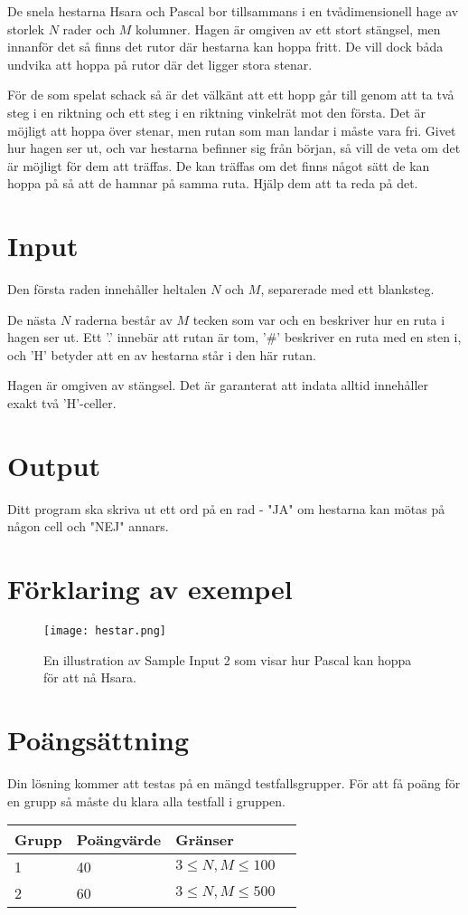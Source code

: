 De snela hestarna Hsara och Pascal bor tillsammans i en tvådimensionell hage av
storlek $N$ rader och $M$ kolumner. Hagen är omgiven av ett stort stängsel, men
innanför det så finns det rutor där hestarna kan hoppa fritt. De vill dock båda
undvika att hoppa på rutor där det ligger stora stenar.

För de som spelat schack så är det välkänt att ett hopp går till genom att ta
två steg i en riktning och ett steg i en riktning vinkelrät mot den första. Det
är möjligt att hoppa över stenar, men rutan som man landar i måste vara fri.
Givet hur hagen ser ut, och var hestarna befinner sig från början, så vill de
veta om det är möjligt för dem att träffas. De kan träffas om det finns något
sätt de kan hoppa på så att de hamnar på samma ruta. Hjälp dem att ta reda på
det.

\section*{Input}
Den första raden innehåller heltalen $N$ och $M$, separerade med ett blanksteg.

De nästa $N$ raderna består av $M$ tecken som var och en beskriver hur en ruta
i hagen ser ut. Ett '.' innebär att rutan är tom, '\#' beskriver en ruta med en
sten i, och 'H' betyder att en av hestarna står i den här rutan.

Hagen är omgiven av stängsel. Det är garanterat att indata alltid innehåller
exakt två 'H'-celler.

\section*{Output}
Ditt program ska skriva ut ett ord på en rad - "JA" om hestarna kan mötas på
någon cell och "NEJ" annars.

\section*{Förklaring av exempel}
\begin{figure}[ht!]
\centering
\texttt{[image: hestar.png]}
\caption{En illustration av Sample Input 2 som visar hur Pascal kan hoppa för att nå Hsara.}
\label{overflow}
\end{figure}

\section*{Poängsättning}
Din lösning kommer att testas på en mängd testfallsgrupper. För att få poäng
för en grupp så måste du klara alla testfall i gruppen.

\begin{tabular}{| l | l | l | l |}
\hline
Grupp & Poängvärde & Gränser \\ \hline
1 & 40 & $3 \le N,M \le 100$ \\ \hline
2 & 60 & $3 \le N,M \le 500$ \\ \hline
\end{tabular}
